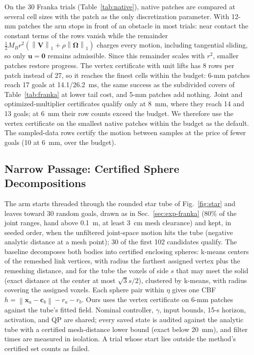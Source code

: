 \documentclass[journal]{IEEEtran}
\theoremstyle{definition}
\newcommand{\norm}[1]{\left\lVert #1\right\rVert}
\begin{document}
On the 30 Franka trials (Table~\ref{tab:native}), native patches are compared at several cell sizes
with the patch as the only discretization parameter. With 12-mm patches the arm stops in front of
an obstacle in most trials: near contact the constant terms of the rows vanish while the remainder
$\tfrac12M_Br^2(\norm{\mathbf V}_1+\rho\norm{\boldsymbol\Omega}_1)$ charges every motion, including
tangential sliding, so only $\mathbf u=\mathbf0$ remains admissible. Since this remainder scales with
$r^2$, smaller patches restore progress. The vertex certificate with unit lifts has 8 rows per patch
instead of 27, so it reaches the finest cells within the budget: 6-mm patches reach 17 goals at
14.1/26.2~ms, the same success as the subdivided covers of Table~\ref{tab:franka} at lower tail cost,
and 5-mm patches add nothing. Joint and optimized-multiplier certificates qualify only at 8~mm, where
they reach 14 and 13 goals; at 6~mm their row counts exceed the budget. We therefore use the vertex
certificate on the smallest native patches within the budget as the default. The sampled-data rows
certify the motion between samples at the price of fewer goals (10 at 6~mm, over the budget).

\subsection{Narrow Passage: Certified Sphere Decompositions}\label{sec:exp-spheres}
The arm starts threaded through the rounded star tube of Fig.~\ref{fig:star} and leaves toward 30
random goals, drawn as in Sec.~\ref{sec:exp-franka} (80\% of the joint ranges, hand above 0.1~m,
at least 3~cm mesh clearance) and kept, in seeded order, when the unfiltered joint-space motion hits
the tube (negative analytic distance at a mesh point); 30 of the first 102 candidates qualify. The
baseline decomposes both bodies into certified enclosing spheres: k-means centers of the remeshed
link vertices, with radius the farthest assigned vertex plus the remeshing distance, and for the
tube the voxels of side $s$ that may meet the solid (exact distance at the center at most
$\sqrt3s/2$), clustered by k-means, with radius covering the assigned voxels. Each sphere pair
within $\eta$ gives one CBF $h=\norm{\mathbf x_a-\mathbf c_b}-r_a-r_b$. Ours uses the vertex
certificate on 6-mm patches against the tube's fitted field. Nominal controller, $\gamma$, input
bounds, 15-s horizon, activation, and QP are shared; every saved state is audited against the
analytic tube with a certified mesh-distance lower bound (exact below 20~mm), and filter times are
measured in isolation. A trial whose start lies outside the method's certified set counts as failed.
\end{document}
